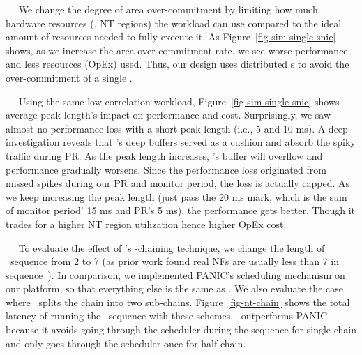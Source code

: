 ~~
We change the degree of area over-commitment by limiting how much hardware resources (\ie, NT regions) the workload can use compared to the ideal amount of resources needed to fully execute it.
As Figure~\ref{fig-sim-single-snic} shows, as we increase the area over-commitment rate, we see worse performance and less resources (OpEx) used. 
Thus, our design uses distributed \snic{}s to avoid the over-commitment of a single \snic.


~~
Using the same low-correlation workload, Figure~\ref{fig-sim-single-snic} shows average peak length's impact on performance and cost.
Surprisingly, we saw almost no performance loss with a short peak length (i.e., 5 and 10 ms). A deep investigation reveals that \snic's deep buffers served as a cushion and absorb the spiky traffic during PR. As the peak length increases, \snic's buffer will overflow and performance gradually worsens.
Since the performance loss originated from missed spikes during our PR and monitor period, the loss is actually capped. As we keep increasing the peak length (just pass the 20 ms mark, which is the sum of monitor period' 15 ms and PR's 5 ms), the performance gets better. Though it trades for a higher NT region utilization hence higher OpEx cost.
\fi


~~
To evaluate the effect of \snic's \nt-chaining technique, we change the length of \nt\ sequence from 2 to 7 (as prior work found real NFs are usually less than 7 in sequence~\cite{NFP-sigcomm17}).
In comparison, we implemented PANIC's scheduling mechanism on our platform, so that everything else is the same as \snic.
We also evaluate the case where \snic\ splits the chain into two sub-chains.
Figure~\ref{fig-nt-chain} shows the total latency of running the \nt\ sequence with these schemes.
\snic\ outperforms PANIC because it avoids going through the scheduler during the sequence for single-chain and only goes through the scheduler once for half-chain.

